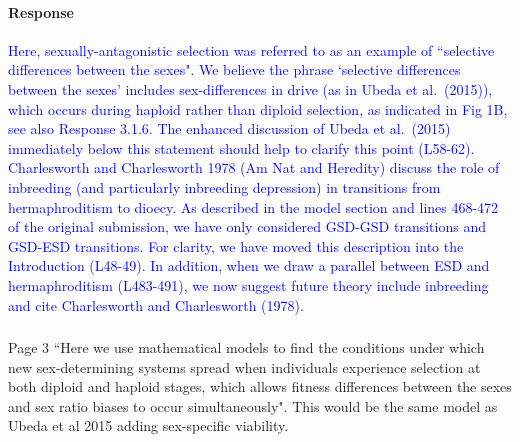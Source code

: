 \documentclass[10pt,letterpaper]{article}
\begin{document}
\noindent\paragraph{Response}
\textcolor{blue}{
Here, sexually-antagonistic selection was referred to as an example of ``selective differences between the sexes". 
We believe the phrase `selective differences between the sexes' includes sex-differences in drive (as in Ubeda et al.\ (2015)), which occurs during haploid rather than diploid selection, as indicated in Fig 1B, see also Response 3.1.6.
The enhanced discussion of Ubeda et al.\ (2015) immediately below this statement should help to clarify this point (L58-62).
\\
\indent 
Charlesworth and Charlesworth 1978 (Am Nat and Heredity) discuss the role of inbreeding (and particularly inbreeding depression) in transitions from hermaphroditism to dioecy. 
As described in the model section and lines 468-472 of the original submission, we have only considered GSD-GSD transitions and GSD-ESD transitions.
For clarity, we have moved this description into the Introduction (L48-49). 
In addition, when we draw a parallel between ESD and hermaphroditism (L483-491), we now suggest future theory include inbreeding and cite Charlesworth and Charlesworth (1978). 
}

\noindent\subsubsection{}
Page 3 ``Here we use mathematical models to find the conditions under which new sex-determining systems spread when individuals experience selection at both diploid and haploid stages, which allows fitness differences between the sexes and sex ratio biases to occur simultaneously".
This would be the same model as Ubeda et al 2015 adding sex-specific viability.
\end{document}
